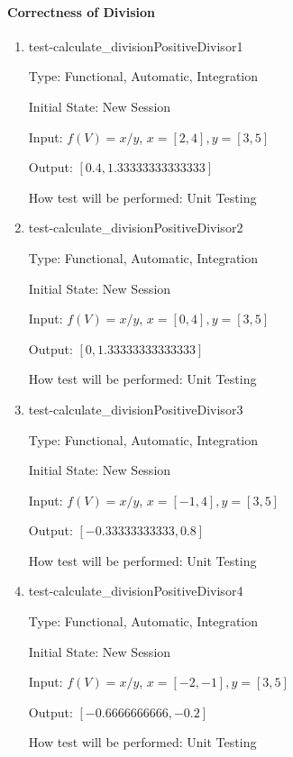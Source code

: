 \documentclass[12pt, titlepage]{article}
\begin{document}
\paragraph{Correctness of Division}

\begin{enumerate}
	
	\item{test-calculate\_divisionPositiveDivisor1}
	
	Type: Functional, Automatic, Integration
	
	Initial State: New Session
	
	Input: $f(V) = x / y$, $x = [2,4], y = [3,5]$
	
	Output: $[0.4,1.33333333333333]$
	
	How test will be performed: Unit Testing\\
	
	\item{test-calculate\_divisionPositiveDivisor2}
	
	Type: Functional, Automatic, Integration
	
	Initial State: New Session
	
	Input: $f(V) = x / y$, $x = [0,4], y = [3,5]$
	
	Output: $[0, 1.33333333333333]$
	
	How test will be performed: Unit Testing\\
	
	\item{test-calculate\_divisionPositiveDivisor3}
	
	Type: Functional, Automatic, Integration
	
	Initial State: New Session
	
	Input: $f(V) = x / y$, $x = [-1,4], y = [3,5]$
	
	Output: $[-0.33333333333,0.8]$
	
	How test will be performed: Unit Testing\\
	
	\item{test-calculate\_divisionPositiveDivisor4}
	
	Type: Functional, Automatic, Integration
	
	Initial State: New Session
	
	Input: $f(V) = x / y$, $x = [-2,-1], y = [3,5]$
	
	Output: $[-0.6666666666,-0.2]$
	
	How test will be performed: Unit Testing\\
	

\end{enumerate}
\end{document}

